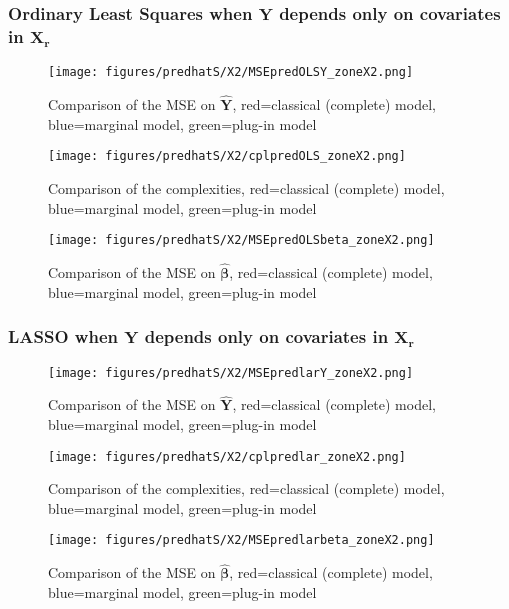 \documentclass[12pt,a4paper]{report}
\begin{document}
\clearpage


\FloatBarrier

\newpage

\subsubsection{Ordinary Least Squares when $\boldsymbol{Y}$ depends only on covariates in $\boldsymbol{X_r}$}

	\begin{figure}[h!]
	\centering
		  \texttt{[image: figures/predhatS/X2/MSEpredOLSY\_zoneX2.png]}
		\caption{Comparison of the MSE on $\hat{\boldsymbol{Y}}$, red=classical (complete) model, blue=marginal model, green=plug-in model}\label{MSEpredOLSY_zoneX2}
	\end{figure}
	\begin{figure}[h!]
	\centering
		  \texttt{[image: figures/predhatS/X2/cplpredOLS\_zoneX2.png]}
		\caption{Comparison of the complexities, red=classical (complete) model, blue=marginal model, green=plug-in model}\label{cplpredOLS_zoneX2}
	\end{figure}
	\begin{figure}[h!]
	\centering
		  \texttt{[image: figures/predhatS/X2/MSEpredOLSbeta\_zoneX2.png]}
		\caption{Comparison of the MSE on $\hat{\boldsymbol{\beta}}$, red=classical (complete) model, blue=marginal model, green=plug-in model}\label{MSEpredOLSbeta_zoneX2}
	\end{figure}
	\FloatBarrier
\newpage
\subsubsection{LASSO when $\boldsymbol{Y}$ depends only on covariates in $\boldsymbol{X_r}$}

	\begin{figure}[h!]
	\centering
		  \texttt{[image: figures/predhatS/X2/MSEpredlarY\_zoneX2.png]}
		\caption{Comparison of the MSE on $\hat{\boldsymbol{Y}}$, red=classical (complete) model, blue=marginal model, green=plug-in model}\label{MSEpredlarY_zoneX2}
	\end{figure}
	\begin{figure}[h!]
	\centering
		  \texttt{[image: figures/predhatS/X2/cplpredlar\_zoneX2.png]}
		\caption{Comparison of the complexities, red=classical (complete) model, blue=marginal model, green=plug-in model}\label{cplpredlar_zoneX2}
	\end{figure}
	\begin{figure}[h!]
	\centering
		  \texttt{[image: figures/predhatS/X2/MSEpredlarbeta\_zoneX2.png]}
		\caption{Comparison of the MSE on $\hat{\boldsymbol{\beta}}$, red=classical (complete) model, blue=marginal model, green=plug-in model}\label{MSEpredlarbeta_zoneX2}
	\end{figure}
	\FloatBarrier
\newpage
\end{document}
